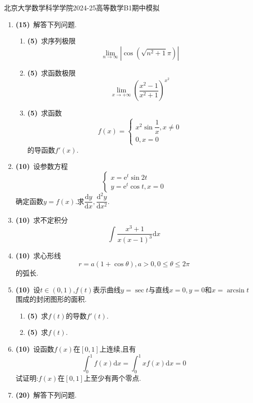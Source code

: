 \documentclass{ctexart}
\newcommand{\e}{\mathrm{e}}
\newcommand{\di}{\mathrm{d}}
\newcommand{\dx}{\di x}
\begin{document}
\pagestyle{empty}
\begin{center}\Large
    北京大学数学科学学院2024-25高等数学B1期中模拟
\end{center}
\begin{enumerate}[leftmargin=*,label=\textbf{\arabic*.}]
    \item \textbf{(15)}\ 解答下列问题.
        \begin{enumerate}[label=\textbf{(\arabic*)}]
            \item \textbf{(5)}\ 求序列极限$$\lim_{n\to\infty}\left|\cos\left(\sqrt{n^2+1}\pi\right)\right|$$
            \item \textbf{(5)}\ 求函数极限$$\lim_{x\to+\infty}\left(\dfrac{x^2-1}{x^2+1}\right)^{x^2}$$
            \item \textbf{(5)}\ 求函数$$f(x)=\left\{\begin{array}{l}x^2\sin\dfrac{1}{x},x\neq 0\\0,x=0\end{array}\right.$$的导函数$f'(x)$.
        \end{enumerate}
    \item \textbf{(10)}\ 设参数方程$$\left\{\begin{array}{l}x=\e^t\sin2t\\y=\e^t\cos t,x=0\end{array}\right.$$确定函数$y=f(x)$.求$\dfrac{\di y}{\dx},\dfrac{\di^2y}{\dx^2}$.
    \item \textbf{(10)}\ 求不定积分$$\int\dfrac{x^3+1}{x(x-1)^3}\dx$$
    \item \textbf{(10)}\ 求心形线$$r=a(1+\cos\theta),a>0,0\leqslant\theta\leqslant2\pi$$的弧长.
    \item \textbf{(10)}\ 设$t\in(0,1)$,$f(t)$表示曲线$y=\sec t$与直线$x=0,y=0$和$x=\arcsin t$围成的封闭图形的面积.
        \begin{enumerate}[label=\textbf{(\arabic*)}]
            \item \textbf{(5)}\ 求$f(t)$的导数$f'(t)$.
            \item \textbf{(5)}\ 求$f(t)$.
        \end{enumerate}
    \item \textbf{(10)}\ 设函数$f(x)$在$[0,1]$上连续,且有$$\int_0^1f(x)\dx=\int_0^1xf(x)\dx=0$$试证明:$f(x)$在$[0,1]$上至少有两个零点.
    \item \textbf{(20)}\ 解答下列问题.
        \begin{enumerate}[label=\textbf{(\arabic*)}]

\end{enumerate}
\end{enumerate}
\end{document}
